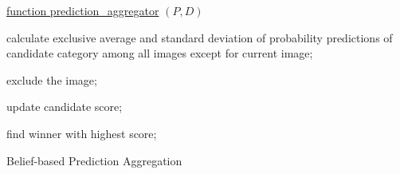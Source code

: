 \documentclass{article}
\begin{document}
\begin{algorithm}

    \underline{function prediction\_aggregator} $(P, D)$\;
     {
    	 {
    		calculate exclusive average and standard deviation of probability predictions of candidate category among all images except for current image;
    		
    		 {
    			exclude the image;
    		}    		    		
    	}
    	update candidate score;
    }
    find winner with highest score;
    \caption{Belief-based Prediction Aggregation}
\end{algorithm}
\end{document}
